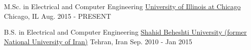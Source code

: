 
\begin{cventries}

  \cventry
    {M.Sc. in Electrical and Computer Engineering} %
    {\href{http://www.uic.edu}{University of Illinois at Chicago}} %
    {Chicago, IL} %
    {Aug. 2015 - PRESENT} %
   {
    }
\end{cventries}
\vspace{-0.7cm}
\begin{cventries}

  \cventry
    {B.S. in Electrical and Computer Engineering} %
    {\href{http://en.sbu.ac.ir/}{Shahid Beheshti University (former National University of Iran)}} %
    {Tehran, Iran} %
    {Sep. 2010 - Jan 2015} %
   {
    }

\end{cventries}
